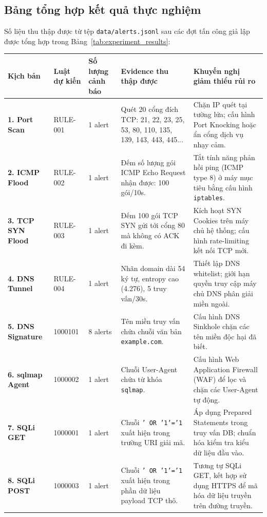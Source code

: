 \subsection{Bảng tổng hợp kết quả thực nghiệm}
Số liệu thu thập được từ tệp \texttt{data/alerts.jsonl} sau các đợt tấn công giả lập được tổng hợp trong Bảng~\ref{tab:experiment_results}:

\begin{table}[H]
    \centering
    \scriptsize
    \renewcommand{\arraystretch}{1.2}
    \begin{tabular}{|C{1.8cm}|C{1.8cm}|C{1.3cm}|C{4.5cm}|C{4.5cm}|}
        \hline
        \textbf{Kịch bản} & \textbf{Luật dự kiến} & \textbf{Số lượng cảnh báo} & \textbf{Evidence thu thập được} & \textbf{Khuyến nghị giảm thiểu rủi ro} \\ \hline
        \textbf{1. Port Scan} & RULE-001 & 1 alert & Quét 20 cổng đích TCP: 21, 22, 23, 25, 53, 80, 110, 135, 139, 143, 443, 445... & Chặn IP quét tại tường lửa; cấu hình Port Knocking hoặc ẩn cổng dịch vụ nhạy cảm. \\ \hline
        \textbf{2. ICMP Flood} & RULE-002 & 1 alert & Đếm số lượng gói ICMP Echo Request nhận được: 100 gói/10s. & Tắt tính năng phản hồi ping (ICMP type 8) ở máy mục tiêu bằng cấu hình \texttt{iptables}. \\ \hline
        \textbf{3. TCP SYN Flood} & RULE-003 & 1 alert & Đếm 100 gói TCP SYN gửi tới cổng 80 mà không có ACK đi kèm. & Kích hoạt SYN Cookies trên máy chủ hệ thống; cấu hình rate-limiting kết nối TCP mới. \\ \hline
        \textbf{4. DNS Tunnel} & RULE-004 & 1 alert & Nhãn domain dài 54 ký tự, entropy cao (4.276), 5 truy vấn/30s. & Thiết lập DNS whitelist; giới hạn quyền truy cập máy chủ DNS phân giải miền ngoài. \\ \hline
        \textbf{5. DNS Signature} & 1000101 & 8 alerts & Tên miền truy vấn chứa chuỗi văn bản \texttt{example.com}. & Cấu hình DNS Sinkhole chặn các tên miền độc hại đã biết. \\ \hline
        \textbf{6. sqlmap Agent} & 1000002 & 1 alert & Chuỗi User-Agent chứa từ khóa \texttt{sqlmap}. & Cấu hình Web Application Firewall (WAF) để lọc và chặn các User-Agent tự động. \\ \hline
        \textbf{7. SQLi GET} & 1000001 & 1 alert & Chuỗi \texttt{' OR '1'='1} xuất hiện trong trường URI giải mã. & Áp dụng Prepared Statements trong truy vấn DB; chuẩn hóa kiểm tra kiểu dữ liệu đầu vào. \\ \hline
        \textbf{8. SQLi POST} & 1000003 & 1 alert & Chuỗi \texttt{' OR '1'='1} xuất hiện trong phần dữ liệu payload TCP thô. & Tương tự SQLi GET, kết hợp sử dụng HTTPS để mã hóa dữ liệu truyền trên đường truyền. \\ \hline

\end{tabular}
\end{table}
